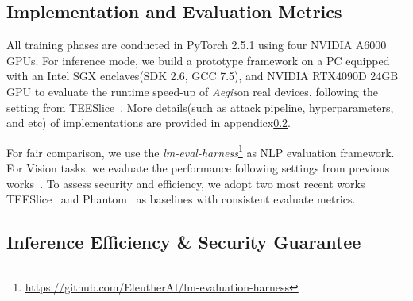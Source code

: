 \documentclass{article}
\newcommand{\method}{\textit{Aegis}}
\begin{document}
\subsection{Implementation and Evaluation Metrics} 
All training phases are conducted in PyTorch 2.5.1 using four NVIDIA A6000 GPUs. For inference mode, we build a prototype framework on a PC equipped with an Intel SGX enclaves(SDK 2.6, GCC 7.5), and NVIDIA RTX4090D 24GB GPU to evaluate the runtime speed-up of \method on real devices, following the setting from TEESlice~\cite{zhang2024no}. More details(such as attack pipeline, hyperparameters, and etc) of implementations are provided in appendicx\ref{}.

For fair comparison, we use the \textit{lm-eval-harness}\footnote{\url{https://github.com/EleutherAI/lm-evaluation-harness}} as NLP evaluation framework. For Vision tasks, we evaluate the performance following settings from previous works~\cite{hu2022lora, AnonymousCoder2025Phantom}. To assess security and efficiency, we adopt two most recent works TEESlice~\cite{zhang2024no} and Phantom~\cite{AnonymousCoder2025Phantom} as baselines with consistent evaluate metrics. 

\subsection{Inference Efficiency \& Security Guarantee}
\begin{table}[htbp]
\centering
\small %
\caption{Inference Overhead Comparison}
\label{tab:utility}
\end{table}
\end{document}
